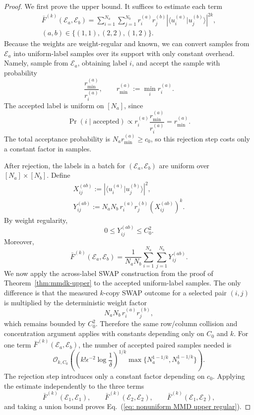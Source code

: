 \documentclass[aps,prx,reprint,superscriptaddress,amsmath,amssymb,longbibliography,floatfix]{revtex4-2}
\newcommand{\Abs}[1]{\left\lvert #1\right\rvert}
\providecommand{\braket}[2]{\langle #1|#2 \rangle}
\newcommand{\scE}{\mathcal{E}}
\newcommand{\scO}{\mathcal{O}}
\theoremstyle{plain}
\theoremstyle{definition}
\theoremstyle{remark}
\begin{document}
\begin{proof}
We first prove the upper bound. It suffices to estimate each term
\[
\begin{gathered}
\bar F^{(k)}(\scE_a,\scE_b)
    =
    \sum_{i=1}^{N_a}\sum_{j=1}^{N_b}
    r_i^{(a)}r_j^{(b)}
    \Abs{\braket{u_i^{(a)}}{u_j^{(b)}}}^{2k},
    \\
    (a,b)\in\{(1,1),(2,2),(1,2)\}.
\end{gathered}
\]
Because the weights are weight-regular and known, we can convert samples from \(\scE_a\) into uniform-label samples over its support with only constant overhead. Namely, sample from \(\scE_a\), obtaining label \(i\), and accept the sample with probability
\begin{equation}
    \frac{r_{\min}^{(a)}}{r_i^{(a)}},
    \qquad
    r_{\min}^{(a)}:=\min_i r_i^{(a)}.
\label{eq:app-nonuniform-rejection-acceptance}
\end{equation}
The accepted label is uniform on \([N_a]\), since
\[
    \Pr(i\mid\mathrm{accepted})
    \propto
    r_i^{(a)}\frac{r_{\min}^{(a)}}{r_i^{(a)}}
    =
    r_{\min}^{(a)}.
\]
The total acceptance probability is \(N_ar_{\min}^{(a)}\ge c_0\), so this rejection step costs only a constant factor in samples.

After rejection, the labels in a batch for \((\scE_a,\scE_b)\) are uniform over
\([N_a]\times[N_b]\). Define
\begin{equation}
\begin{gathered}
X_{ij}^{(ab)}
    :=
    \Abs{\braket{u_i^{(a)}}{u_j^{(b)}}}^2,
    \\
    Y_{ij}^{(ab)}
    :=
    N_aN_b\,r_i^{(a)}r_j^{(b)}\left(X_{ij}^{(ab)}\right)^k.
\end{gathered}
\label{eq:app-nonuniform-weighted-pair-observable}
\end{equation}
By weight regularity,
\[
    0\le Y_{ij}^{(ab)}\le C_0^2 .
\]
Moreover,
\[
    \bar F^{(k)}(\scE_a,\scE_b)
    =
    \frac1{N_aN_b}\sum_{i=1}^{N_a}\sum_{j=1}^{N_b}Y_{ij}^{(ab)}.
\]
We now apply the across-label SWAP construction from the proof of Theorem~\ref{thm:mmdk-upper} to the accepted uniform-label samples. The only difference is that the measured \(k\)-copy SWAP outcome for a selected pair \((i,j)\) is multiplied by the deterministic weight factor
\[
    N_aN_b\,r_i^{(a)}r_j^{(b)},
\]
which remains bounded by \(C_0^2\). Therefore the same row/column collision and concentration argument applies with constants depending only on \(C_0\) and \(k\). For one term \(\bar F^{(k)}(\scE_a,\scE_b)\), the number of accepted paired samples needed is
\[
    \scO_{k,C_0}\!\left(
        \left(k!\epsilon^{-2}\log\frac1\delta\right)^{1/k}
        \max\{N_a^{1-1/k},N_b^{1-1/k}\}
    \right).
\]
The rejection step introduces only a constant factor depending on \(c_0\). Applying the estimate independently to the three terms
\[
    \bar F^{(k)}(\scE_1,\scE_1),
    \qquad
    \bar F^{(k)}(\scE_2,\scE_2),
    \qquad
    \bar F^{(k)}(\scE_1,\scE_2),
\]
and taking a union bound proves Eq.~(\ref{eq: nonuniform MMD upper regular}).


\end{proof}
\end{document}
